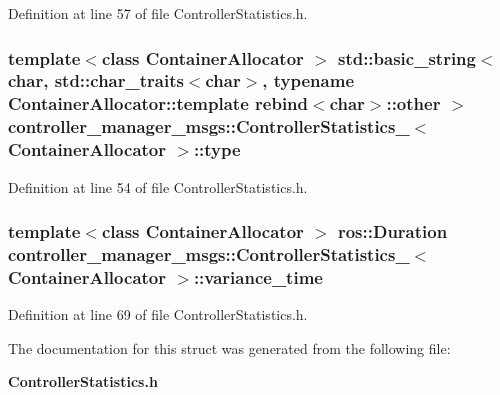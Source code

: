 \-Definition at line 57 of file \-Controller\-Statistics.\-h.

\subsubsection[{type}]{\setlength{\rightskip}{0pt plus 5cm}template$<$class Container\-Allocator $>$ std\-::basic\-\_\-string$<$char, std\-::char\-\_\-traits$<$char$>$, typename \-Container\-Allocator\-::template rebind$<$char$>$\-::other $>$ {\bf controller\-\_\-manager\-\_\-msgs\-::\-Controller\-Statistics\-\_\-}$<$ \-Container\-Allocator $>$\-::{\bf type}}\label{structcontroller__manager__msgs_1_1ControllerStatistics___ab941e5fe250d135f770e065a6ca9c27b}


\-Definition at line 54 of file \-Controller\-Statistics.\-h.

\subsubsection[{variance\-\_\-time}]{\setlength{\rightskip}{0pt plus 5cm}template$<$class Container\-Allocator $>$ ros\-::\-Duration {\bf controller\-\_\-manager\-\_\-msgs\-::\-Controller\-Statistics\-\_\-}$<$ \-Container\-Allocator $>$\-::{\bf variance\-\_\-time}}\label{structcontroller__manager__msgs_1_1ControllerStatistics___ab6721e8ccaa0a2102a0089aa0b86a22a}


\-Definition at line 69 of file \-Controller\-Statistics.\-h.



\-The documentation for this struct was generated from the following file\-:\begin{DoxyCompactItemize}
\item 
{\bf \-Controller\-Statistics.\-h}\end{DoxyCompactItemize}
